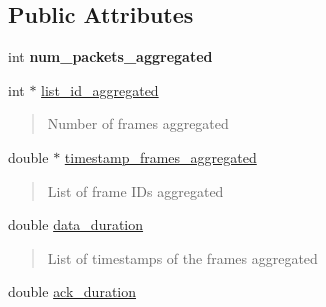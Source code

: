 \subsection*{Public Attributes}
\begin{DoxyCompactItemize}
\item 
\mbox{\label{structTxInfo_ad9330c0b3beeb838cd546e16a5d7f573}} 
int {\bfseries num\+\_\+packets\+\_\+aggregated}
\item 
\mbox{\label{structTxInfo_a46856167d9637218385e9ddfa7034984}} 
int $\ast$ \hyperlink{structTxInfo_a46856167d9637218385e9ddfa7034984}{list\+\_\+id\+\_\+aggregated}
\begin{DoxyCompactList}\small\item\em \begin{quote}
Number of frames aggregated \end{quote}
\end{DoxyCompactList}\item 
\mbox{\label{structTxInfo_a580141793f2337ee6d96f9134ddf1b3d}} 
double $\ast$ \hyperlink{structTxInfo_a580141793f2337ee6d96f9134ddf1b3d}{timestamp\+\_\+frames\+\_\+aggregated}
\begin{DoxyCompactList}\small\item\em \begin{quote}
List of frame I\+Ds aggregated \end{quote}
\end{DoxyCompactList}\item 
\mbox{\label{structTxInfo_afce12cf3642f5e1b325aa58e57c3448b}} 
double \hyperlink{structTxInfo_afce12cf3642f5e1b325aa58e57c3448b}{data\+\_\+duration}
\begin{DoxyCompactList}\small\item\em \begin{quote}
List of timestamps of the frames aggregated \end{quote}
\end{DoxyCompactList}\item 
\mbox{\label{structTxInfo_a4261165f0eaaf2f1edffdafd0910e9d6}} 
double \hyperlink{structTxInfo_a4261165f0eaaf2f1edffdafd0910e9d6}{ack\+\_\+duration}
\begin{DoxyCompactList}\small\item\em \begin{quote}

\end{quote}
\end{DoxyCompactList}
\end{DoxyCompactItemize}
